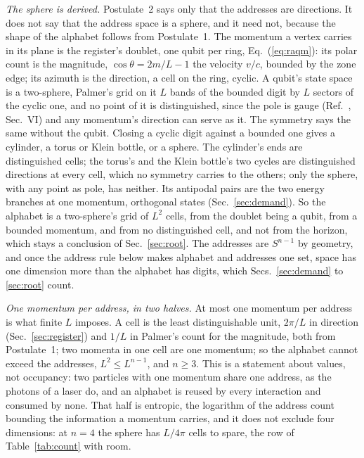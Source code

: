 \documentclass[aps,prd,twocolumn,superscriptaddress,nofootinbib]{revtex4-2}
\begin{document}
\textit{The sphere is derived.} Postulate~2 says only that the addresses are directions. It does not say that the address space is a sphere, and it need not, because the shape of the alphabet follows from Postulate~1. The momentum a vertex carries in its plane is the register's doublet, one qubit per ring, Eq.~(\ref{eq:raqm}): its polar count is the magnitude, $\cos\theta = 2m/L-1$ the velocity $v/c$, bounded by the zone edge; its azimuth is the direction, a cell on the ring, cyclic. A qubit's state space is a two-sphere, Palmer's grid on it $L$ bands of the bounded digit by $L$ sectors of the cyclic one, and no point of it is distinguished, since the pole is gauge (Ref.~\cite{korytko2026c}, Sec.~VI) and any momentum's direction can serve as it. The symmetry says the same without the qubit. Closing a cyclic digit against a bounded one gives a cylinder, a torus or Klein bottle, or a sphere. The cylinder's ends are distinguished cells; the torus's and the Klein bottle's two cycles are distinguished directions at every cell, which no symmetry carries to the others; only the sphere, with any point as pole, has neither. Its antipodal pairs are the two energy branches at one momentum, orthogonal states (Sec.~\ref{sec:demand}). So the alphabet is a two-sphere's grid of $L^2$ cells, from the doublet being a qubit, from a bounded momentum, and from no distinguished cell, and not from the horizon, which stays a conclusion of Sec.~\ref{sec:root}. The addresses are $S^{n-1}$ by geometry, and once the address rule below makes alphabet and addresses one set, space has one dimension more than the alphabet has digits, which Secs.~\ref{sec:demand} to \ref{sec:root} count.

\textit{One momentum per address, in two halves.} At most one momentum per address is what finite $L$ imposes. A cell is the least distinguishable unit, $2\pi/L$ in direction (Sec.~\ref{sec:register}) and $1/L$ in Palmer's count for the magnitude, both from Postulate~1; two momenta in one cell are one momentum; so the alphabet cannot exceed the addresses, $L^2 \le L^{n-1}$, and $n \ge 3$. This is a statement about values, not occupancy: two particles with one momentum share one address, as the photons of a laser do, and an alphabet is reused by every interaction and consumed by none. That half is entropic, the logarithm of the address count bounding the information a momentum carries, and it does not exclude four dimensions: at $n = 4$ the sphere has $L/4\pi$ cells to spare, the row of Table~\ref{tab:count} with room.
\end{document}
